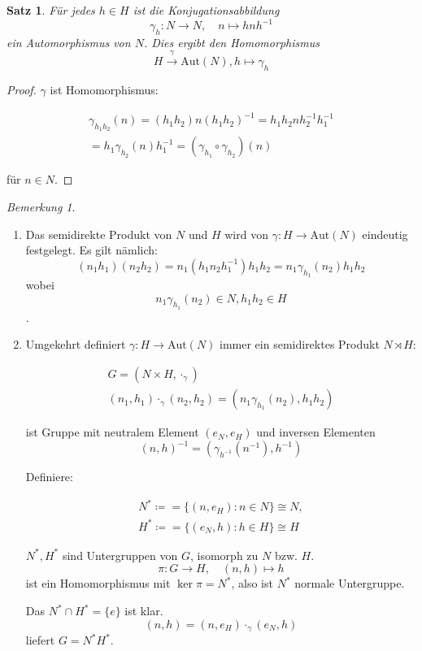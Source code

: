 \documentclass[12pt]{scrartcl}%
\newtheorem{thm}{Satz}
\theoremstyle{definition}
\theoremstyle{remark}
\newtheorem*{nb}{Bemerkung}
\newcommand{\inv}[1]{\left(#1\right)^{-1}}
\newcommand{\Inv}[1]{#1^{-1}}
\begin{document}
\begin{thm}
    Für jedes $h\in H$ ist die Konjugationsabbildung $$\gamma_h: N\to N, \quad n\mapsto hn\Inv{h}$$ ein Automorphismus von $N$. Dies ergibt den Homomorphismus $$H\overset{\gamma}{\longrightarrow} \text{Aut}(N), h\mapsto \gamma_h$$
\end{thm}

\begin{proof}
    $\gamma$ ist Homomorphismus:

    \begin{gather*}
        \gamma_{h_1h_2}(n)=(h_1h_2)n\inv{h_1h_2}=h_1h_2n\Inv{h_2}\Inv{h_1} \\
        = h_1\gamma_{h_2}(n)\Inv{h_1}=(\gamma_{h_1}\circ\gamma_{h_2})(n)
    \end{gather*}

    für $n\in N$.
\end{proof}

\begin{nb}
    \begin{enumerate}[label=(\arabic*)]
        \item Das semidirekte Produkt von $N$ und $H$ wird von $\gamma: H\to \text{Aut}(N)$ eindeutig festgelegt. Es gilt nämlich: $$(n_1h_1)(n_2h_2)=n_1(h_1n_2\Inv{h_1})h_1h_2=n_1\gamma_{h_1}(n_2)h_1h_2$$ wobei $$n_1\gamma_{h_1}(n_2)\in N, h_1h_2\in H$$.
        \item Umgekehrt definiert $\gamma: H\to \text{Aut}(N)$ immer ein semidirektes Produkt $N\rtimes H$:

            \begin{gather*}
                G=(N\times H, \cdot_\gamma) \\
                (n_1,h_1)\cdot_\gamma (n_2,h_2)=(n_1\gamma_{h_1}(n_2), h_1h_2)
            \end{gather*}

            ist Gruppe mit neutralem Element $(e_N, e_H)$ und inversen Elementen $$\Inv{(n,h)}=(\gamma_{\Inv{h}}(\Inv{n}),\Inv{h})$$

            Definiere:

            \begin{gather*}
                N^*\coloneqq = \{(n, e_H): n\in N\} \cong N, \\
                H^*\coloneqq = \{(e_N, h): h\in H\} \cong H
            \end{gather*}

            $N^*,H^*$ sind Untergruppen von $G$, isomorph zu $N$ bzw. $H$. $$\pi: G\longrightarrow H, \quad (n,h)\mapsto h$$ ist ein Homomorphismus mit $\ker \pi = N^*$, also ist $N^*$ normale Untergruppe.

            Das $N^*\cap H^* = \{e\}$ ist klar. $$(n,h)=(n,e_H)\cdot_\gamma (e_N, h)$$ liefert $G=N^*H^*$.
    \end{enumerate}
\end{nb}
\end{document}
